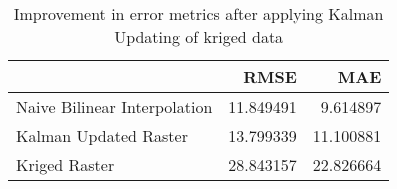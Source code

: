 \begin{table}
\caption{Improvement in error metrics after applying Kalman Updating of kriged data}
\label{tab:big_island_gebco_raster_error}
\begin{tabular}{lrr}
\toprule
 & RMSE & MAE \\
\midrule
Naive Bilinear Interpolation & 11.849491 & 9.614897 \\
Kalman Updated Raster & 13.799339 & 11.100881 \\
Kriged Raster & 28.843157 & 22.826664 \\
\bottomrule
\end{tabular}
\end{table}
